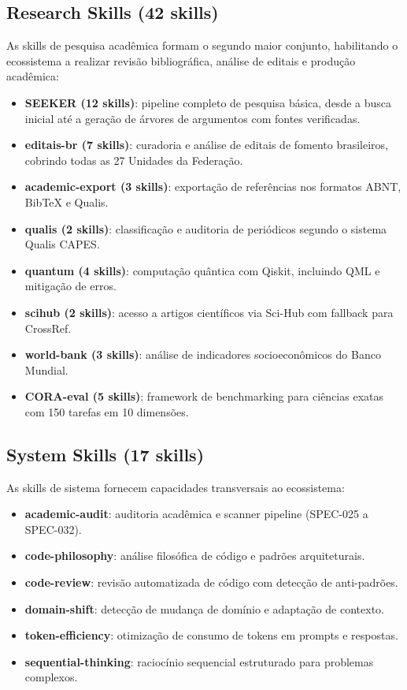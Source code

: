 \subsection{Research Skills (42 skills)}
\label{subsec:research-skills}

As skills de pesquisa acadêmica formam o segundo maior conjunto,
habilitando o ecossistema a realizar revisão bibliográfica, análise
de editais e produção acadêmica:

\begin{itemize}
\item \textbf{SEEKER (12 skills)}: pipeline completo de pesquisa básica,
desde a busca inicial até a geração de árvores de argumentos com
fontes verificadas.
\item \textbf{editais-br (7 skills)}: curadoria e análise de editais
de fomento brasileiros, cobrindo todas as 27 Unidades da Federação.
\item \textbf{academic-export (3 skills)}: exportação de referências
nos formatos ABNT, BibTeX e Qualis.
\item \textbf{qualis (2 skills)}: classificação e auditoria de
periódicos segundo o sistema Qualis CAPES.
\item \textbf{quantum (4 skills)}: computação quântica com Qiskit,
incluindo QML e mitigação de erros.
\item \textbf{scihub (2 skills)}: acesso a artigos científicos via
Sci-Hub com fallback para CrossRef.
\item \textbf{world-bank (3 skills)}: análise de indicadores
socioeconômicos do Banco Mundial.
\item \textbf{CORA-eval (5 skills)}: framework de benchmarking para
ciências exatas com 150 tarefas em 10 dimensões.
\end{itemize}

\subsection{System Skills (17 skills)}
\label{subsec:system-skills}

As skills de sistema fornecem capacidades transversais ao ecossistema:

\begin{itemize}
\item \textbf{academic-audit}: auditoria acadêmica e scanner pipeline
(SPEC-025 a SPEC-032).
\item \textbf{code-philosophy}: análise filosófica de código e padrões
arquiteturais.
\item \textbf{code-review}: revisão automatizada de código com
detecção de anti-padrões.
\item \textbf{domain-shift}: detecção de mudança de domínio e
adaptação de contexto.
\item \textbf{token-efficiency}: otimização de consumo de tokens em
prompts e respostas.
\item \textbf{sequential-thinking}: raciocínio sequencial estruturado
para problemas complexos.
\end{itemize}

